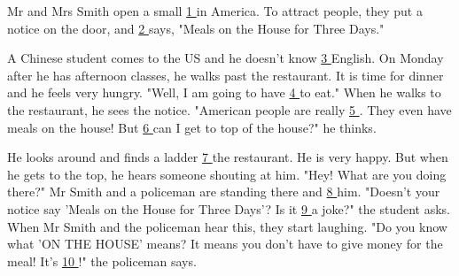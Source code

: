 \item{
    Mr and Mrs Smith open a small \underline{ 1 } in America. To attract people, they put a notice on the door, and \underline{ 2 } says, "Meals on the House for Three Days."

    A Chinese student comes to the US and he doesn't know \underline{ 3 } English. On Monday after he has afternoon classes, he walks past the restaurant. It is time for dinner and he feels very hungry. "Well, I am going to have \underline{ 4 } to eat." When he walks to the restaurant, he sees the notice. "American people are really \underline{ 5 }. They even have meals on the house! But \underline{ 6 } can I get to top of the house?" he thinks.

    He looks around and finds a ladder \underline{ 7 } the restaurant. He is very happy. But when he gets to the top, he hears someone shouting at him. "Hey! What are you doing there?" Mr Smith and a policeman are standing there and \underline{ 8 } him. "Doesn't your notice say 'Meals on the House for Three Days'? Is it \underline{ 9 } a joke?" the student asks. When Mr Smith and the policeman hear this, they start laughing. "Do you know what 'ON THE HOUSE' means? It means you don't have to give money for the meal! It's \underline{ 10 }!" the policeman says.

}
